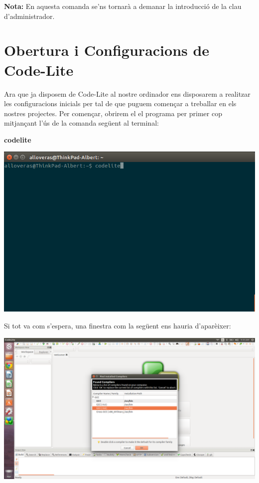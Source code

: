 \documentclass[11pt]{article}
\begin{document}
\noindent \textbf{Nota:} En aquesta comanda se'ns tornarà a demanar la introducció de la clau d'administrador.

\section{Obertura i Configuracions de Code-Lite}
Ara que ja disposem de Code-Lite al nostre ordinador ens disposarem a realitzar les configuracions inicials per tal de que puguem començar a treballar en els nostres projectes. Per començar, obrirem el el programa per primer cop mitjançant l'ús de la comanda següent al terminal:
\begin{center}
	\textbf{codelite}
\end{center}
\begin{center}
	\includegraphics[scale=0.4]{img/CodeLite_First_Opening.png}
\end{center}

\pagebreak \noindent Si tot va com s'espera, una finestra com la següent ens hauria d'aparèixer:

\begin{center}
	\includegraphics[scale=0.25]{img/Compiler_Selection_CodeLite.png}
\end{center}
\end{document}
